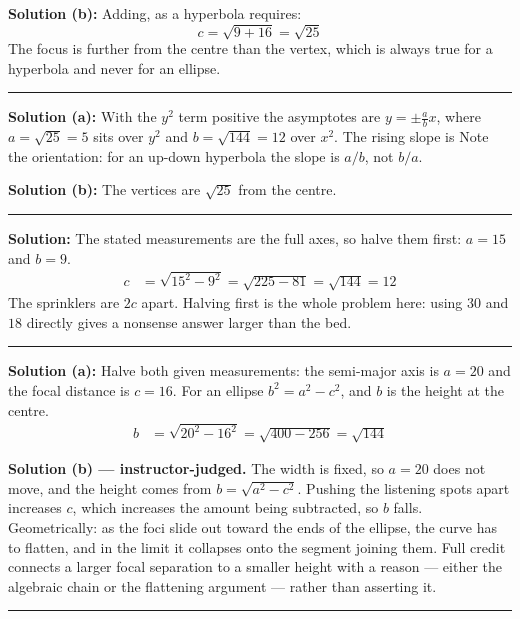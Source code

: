 \documentclass[12pt]{article}
\begin{document}
\textbf{Solution (b):} Adding, as a hyperbola requires:
\[ c = \sqrt{9 + 16} = \sqrt{25} \]
The focus is further from the centre than the vertex, which is always true for a hyperbola
and never for an ellipse.

\vspace{0.2cm}\noindent\rule{\linewidth}{0.2pt}


\textbf{Solution (a):} With the $y^2$ term positive the asymptotes are
$y = \pm\frac{a}{b}x$, where $a = \sqrt{25} = 5$ sits over $y^2$ and $b = \sqrt{144} = 12$
over $x^2$. The rising slope is 
Note the orientation: for an up-down hyperbola the slope is $a/b$, not $b/a$.

\textbf{Solution (b):} The vertices are $\sqrt{25}$ from the centre. 

\vspace{0.2cm}\noindent\rule{\linewidth}{0.2pt}


\textbf{Solution:} The stated measurements are the full axes, so halve them first:
$a = 15$ and $b = 9$.
\begin{align*}
  c &= \sqrt{15^2 - 9^2} = \sqrt{225 - 81} = \sqrt{144} = 12
\end{align*}
The sprinklers are $2c$ apart. 
Halving first is the whole problem here: using $30$ and $18$ directly gives a nonsense
answer larger than the bed.

\vspace{0.2cm}\noindent\rule{\linewidth}{0.2pt}


\textbf{Solution (a):} Halve both given measurements: the semi-major axis is $a = 20$ and the
focal distance is $c = 16$. For an ellipse $b^2 = a^2 - c^2$, and $b$ is the height at the
centre.
\begin{align*}
  b &= \sqrt{20^2 - 16^2} = \sqrt{400 - 256} = \sqrt{144}
\end{align*}

\vspace{0.15cm}
\textbf{Solution (b) --- instructor-judged.} The width is fixed, so $a = 20$ does not move,
and the height comes from $b = \sqrt{a^2 - c^2}$. Pushing the listening spots apart increases
$c$, which increases the amount being subtracted, so $b$ falls. Geometrically: as the foci
slide out toward the ends of the ellipse, the curve has to flatten, and in the limit it
collapses onto the segment joining them. Full credit connects a larger focal separation to a
smaller height with a reason --- either the algebraic chain or the flattening argument ---
rather than asserting it.

\vspace{0.2cm}\noindent\rule{\linewidth}{0.2pt}
\end{document}
